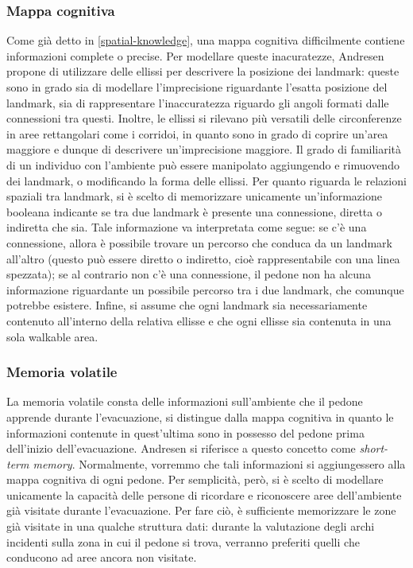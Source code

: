 \documentclass[12pt,a4paper,openright,oneside]{book}
\begin{document}
\subsubsection{Mappa cognitiva}
Come già detto in \ref{spatial-knowledge}, una mappa cognitiva difficilmente contiene informazioni complete o precise. Per modellare queste inacuratezze, Andresen \cite{Andresen2018} propone di utilizzare delle ellissi per descrivere la posizione dei landmark: queste sono in grado sia di modellare l’imprecisione riguardante l’esatta posizione del landmark, sia di rappresentare l’inaccuratezza riguardo gli angoli formati dalle connessioni tra questi. Inoltre, le ellissi si rilevano più versatili delle circonferenze in aree rettangolari come i corridoi, in quanto sono in grado di coprire un'area maggiore e dunque di descrivere un'imprecisione maggiore. Il grado di familiarità di un individuo con l’ambiente può essere manipolato aggiungendo e rimuovendo dei landmark, o modificando la forma delle ellissi. Per quanto riguarda le relazioni spaziali tra landmark, si è scelto di memorizzare unicamente un’informazione booleana indicante se tra due landmark è presente una connessione, diretta o indiretta che sia. Tale informazione va interpretata come segue: se c’è una connessione, allora è possibile trovare un percorso che conduca da un landmark all’altro (questo può essere diretto o indiretto, cioè rappresentabile con una linea spezzata); se al contrario non c’è una connessione, il pedone non ha alcuna informazione riguardante un possibile percorso tra i due landmark, che comunque potrebbe esistere. Infine, si assume che ogni landmark sia necessariamente contenuto all’interno della relativa ellisse e che ogni ellisse sia contenuta in una sola walkable area.

\subsubsection{Memoria volatile}
La memoria volatile consta delle informazioni sull’ambiente che il pedone apprende durante l’evacuazione, si distingue dalla mappa cognitiva in quanto le informazioni contenute in quest’ultima sono in possesso del pedone prima dell’inizio dell’evacuazione. Andresen \cite{Andresen2018} si riferisce a questo concetto come \emph{short-term memory}. Normalmente, vorremmo che tali informazioni si aggiungessero alla mappa cognitiva di ogni pedone. Per semplicità, però, si è scelto di modellare unicamente la capacità delle persone di ricordare e riconoscere aree dell’ambiente già visitate durante l’evacuazione. Per fare ciò, è sufficiente memorizzare le zone già visitate in una qualche struttura dati: durante la valutazione degli archi incidenti sulla zona in cui il pedone si trova, verranno preferiti quelli che conducono ad aree ancora non visitate.
\end{document}
